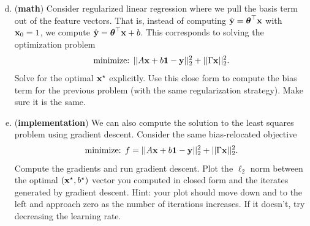 \documentclass[12pt,letterpaper]{hmcpset}
\begin{document}
\begin{problem}[3 (continued)]
\begin{enumerate}[(a)]
	\setcounter{enumi}{3}
\item (\textbf{math}) Consider regularized linear regression where we pull the
basis term out of the feature vectors. That is, instead of computing $\hat{{\bf y}}
= \hbox{\boldmath$\theta$}^\top{\bf x}$ with ${\bf x}_0 = 1$, we compute $\hat{{\bf y}} = \hbox{\boldmath$\theta$}^\top{\bf x} + b$.
This corresponds to solving the optimization problem
$$
\text{minimize: } ||A{\bf x} + b{\bf 1} - {\bf y}||_2^2 + ||\Gamma{\bf x}||_2^2.
$$
Solve for the optimal ${\bf x}^\star$ explicitly. Use this close form to compute the
bias term for the previous problem (with the same regularization strategy). Make
sure it is the same.
\newline
\item (\textbf{implementation}) We can also compute the solution to the least squares
problem using gradient descent. Consider the same bias-relocated objective
$$
\text{minimize: } f = ||A{\bf x} + b{\bf 1} - {\bf y}||_2^2 + ||\Gamma{\bf x}||_2^2.
$$
Compute the gradients and run gradient descent. Plot the $\ell_2$ norm
between the optimal $({\bf x}^\star, b^\star)$ vector you computed in closed form
and the iterates generated by gradient descent. Hint: your plot should move
down and to the left and approach zero as the number of iterations increases. If
it doesn't, try decreasing the learning rate.
\end{enumerate}
\end{problem}
\end{document}
